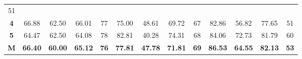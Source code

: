 \begin{table}[H]
{\begin{tabular}{ccccccccccccc}
			\multicolumn{1}{c|}{51} \\ \cline{2-13} 
			\multicolumn{1}{c|}{\cellcolor[HTML]{D9D9D9}\textbf{4}} &
			\multicolumn{1}{c|}{66.88} &
			\multicolumn{1}{c|}{62.50} &
			\multicolumn{1}{c|}{66.01} &
			\multicolumn{1}{c|}{77} &
			\multicolumn{1}{c|}{75.00} &
			\multicolumn{1}{c|}{48.61} &
			\multicolumn{1}{c|}{69.72} &
			\multicolumn{1}{c|}{67} &
			\multicolumn{1}{c|}{82.86} &
			\multicolumn{1}{c|}{56.82} &
			\multicolumn{1}{c|}{77.65} &
			\multicolumn{1}{c|}{51} \\ \cline{2-13} 
			\multicolumn{1}{c|}{\cellcolor[HTML]{D9D9D9}\textbf{5}} &
			\multicolumn{1}{c|}{64.47} &
			\multicolumn{1}{c|}{62.50} &
			\multicolumn{1}{c|}{64.08} &
			\multicolumn{1}{c|}{78} &
			\multicolumn{1}{c|}{82.81} &
			\multicolumn{1}{c|}{40.28} &
			\multicolumn{1}{c|}{74.31} &
			\multicolumn{1}{c|}{68} &
			\multicolumn{1}{c|}{84.06} &
			\multicolumn{1}{c|}{72.73} &
			\multicolumn{1}{c|}{81.79} &
			\multicolumn{1}{c|}{60} \\ \cline{2-13} 
			\multicolumn{1}{c|}{\cellcolor[HTML]{FFFF00}\textbf{M}} &
			\multicolumn{1}{c|}{\textbf{66.40}} &
			\multicolumn{1}{c|}{\textbf{60.00}} &
			\multicolumn{1}{c|}{\textbf{65.12}} &
			\multicolumn{1}{c|}{\textbf{76}} &
			\multicolumn{1}{c|}{\textbf{77.81}} &
			\multicolumn{1}{c|}{\textbf{47.78}} &
			\multicolumn{1}{c|}{\textbf{71.81}} &
			\multicolumn{1}{c|}{\textbf{69}} &
			\multicolumn{1}{c|}{\textbf{86.53}} &
			\multicolumn{1}{c|}{\textbf{64.55}} &
			\multicolumn{1}{c|}{\textbf{82.13}} &
			\multicolumn{1}{c|}{\textbf{53}} \\ \cline{2-13} 
		\end{tabular}%
	}
\end{table}